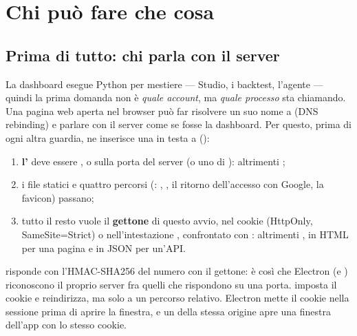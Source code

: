 \section{Chi può fare che cosa}\label{sez:permessi}

\subsection{Prima di tutto: chi parla con il server}\label{sez:accesso-locale}

La dashboard esegue Python per mestiere --- Studio, i backtest, l'agente ---
quindi la prima domanda non è \emph{quale account}, ma \emph{quale
processo} sta chiamando. Una pagina web aperta nel browser può far risolvere
un suo nome a  (DNS rebinding) e parlare con il server come
se fosse la dashboard. Per questo, prima di ogni altra guardia,
 ne inserisce una in testa a
 ():

\begin{enumerate}
  \item \textbf{l'} deve essere , 
        o \cod{[::1]} sulla porta del server (o uno di
        ): altrimenti ;
  \item i file statici e quattro percorsi (:
        , ,
        il ritorno dell'accesso con Google, la favicon) passano;
  \item tutto il resto vuole il \textbf{gettone} di questo avvio, nel cookie
         (HttpOnly, SameSite=Strict) o nell'intestazione
        , confrontato con :
        altrimenti , in HTML per una pagina e in JSON per un'API.
\end{enumerate}

\noindent
{} risponde con l'HMAC-SHA256 del numero con il
gettone: è così che Electron (e ) riconoscono il
proprio server fra quelli che rispondono su una porta. 
imposta il cookie e reindirizza, ma solo a un percorso relativo. Electron
mette il cookie nella sessione prima di aprire la finestra, e un
 della stessa origine apre una finestra dell'app con lo
stesso cookie.

